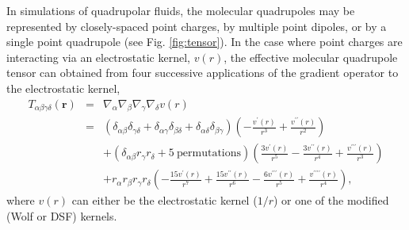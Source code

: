 In simulations of quadrupolar fluids, the molecular quadrupoles may be
represented by closely-spaced point charges, by multiple point
dipoles, or by a single point quadrupole (see
Fig. \ref{fig:tensor}).  In the case where point charges are
interacting via an electrostatic kernel, $v(r)$, the effective
molecular quadrupole tensor can obtained from four successive
applications of the gradient operator to the electrostatic kernel,
\begin{eqnarray}
T_{\alpha\beta\gamma\delta}(\mathbf{r}) &=& \nabla_\alpha \nabla_\beta
                                   \nabla_\gamma \nabla_\delta v(r) \\
 &=& \left(\delta_{\alpha\beta}\delta_{\gamma\delta} +
     \delta_{\alpha\gamma}\delta_{\beta\delta}+
     \delta_{\alpha\delta}\delta_{\beta\gamma}\right)\left(-\frac{v^\prime(r)}{r^3}
     + \frac{v^{\prime \prime}(r)}{r^2}\right) \nonumber \\
 & &+ \left(\delta_{\alpha\beta} r_\gamma r_\delta + 5  \mathrm{~permutations}
     \right) \left(\frac{3v^\prime(r)}{r^5}-\frac{3v^{\prime \prime}(r)}{r^4} +
     \frac{v^{\prime \prime \prime}(r)}{r^3}\right) \nonumber \\
 & &+ r_\alpha r_\beta r_\gamma r_\delta
     \left(-\frac{15v^\prime(r)}{r^7}+\frac{15v^{\prime \prime}(r)}{r^6}-\frac{6v^{\prime
     \prime \prime}(r)}{r^5} + \frac{v^{\prime \prime \prime \prime}(r)}{r^4}\right),
\label{quadCharge}
\end{eqnarray}
where $v(r)$ can either be the electrostatic kernel ($1/r$) or one of
the modified (Wolf or DSF) kernels.  

